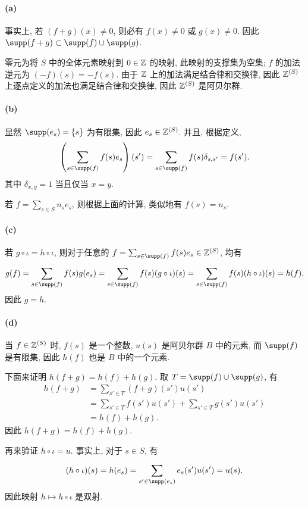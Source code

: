 \documentclass{article}
\begin{document}
\begin{solution}
	\paragraph{(a)} 事实上, 若 $(f+g)(x) \neq 0$, 则必有 $f(x) \neq 0$ 或 $g(x) \neq 0$. 因此 $\supp(f+g) \subset \supp(f) \cup \supp(g)$. 

	零元为将 $S$ 中的全体元素映射到 $0 \in \mathbb{Z}$ 的映射, 此映射的支撑集为空集; $f$ 的加法逆元为 $(-f)(s) = -f(s)$. 由于 $\mathbb{Z}$ 上的加法满足结合律和交换律, 因此 $\mathbb{Z}^{(S)}$ 上逐点定义的加法也满足结合律和交换律, 因此 $\mathbb{Z}^{(S)}$ 是阿贝尔群.

	\paragraph{(b)} 显然 $\supp(e_s) = \{s\}$ 为有限集, 因此 $e_s \in \mathbb{Z}^{(S)}$. 并且, 根据定义, 
	\[ \left( \sum_{s \in \supp(f)}^{}f(s)e_s \right)(s') = \sum_{s \in \supp(f)}^{} f(s) \delta_{s,s'} = f(s'). \]
	其中 $\delta_{x, y} = 1$ 当且仅当 $x = y$.

	若 $f = \sum_{s \in S}^{} n_s e_s$, 则根据上面的计算, 类似地有 $f(s) = n_s$. 

	\paragraph{(c)} 若 $g \circ \iota = h \circ \iota$, 则对于任意的 $f = \sum_{s \in \supp(f)}^{}f(s)e_s \in \Z^{(S)}$, 均有
	\[ g(f) = \sum_{s \in \supp(f)}^{}f(s)g(e_s) = \sum_{s \in \supp(f)}^{} f(s) (g \circ \iota)(s)
	= \sum_{s \in \supp(f)}^{} f(s) (h \circ \iota)(s) = h(f). \]
	因此 $g = h$. 

	\paragraph{(d)} 当 $f \in \mathbb{Z}^{(S)}$ 时, $f(s)$ 是一个整数, $u(s)$ 是阿贝尔群 $B$ 中的元素, 而 $\supp(f)$ 是有限集, 因此 $h(f)$ 也是 $B$ 中的一个元素. 

	下面来证明 $h(f+g) = h(f) + h(g)$. 取 $T = \supp(f) \cup \supp(g)$, 有
	\begin{align*}
		h(f+g) &= \sum_{s' \in T}^{}(f+g)(s')u(s') \\
		&= \sum_{s' \in T}^{}f(s')u(s') + \sum_{s' \in T}^{}g(s')u(s') \\
		&= h(f) + h(g).
	\end{align*}
	因此 $h(f+g) = h(f) + h(g)$.

	再来验证 $h \circ \iota = u$. 事实上, 对于 $s \in S$, 有
	\[ (h \circ \iota)(s) = h(e_s) = \sum_{s' \in \supp(e_s)}^{}e_s(s') u(s') = u(s). \]
	因此映射 $h \mapsto h \circ \iota$ 是双射. 
\end{solution}
\end{document}
